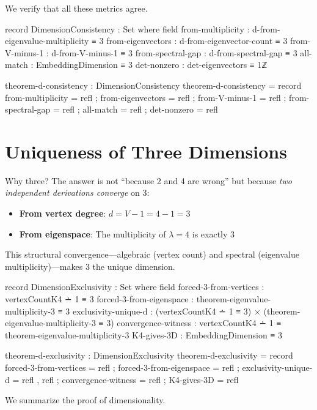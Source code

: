 \documentclass[11pt,a4paper]{book}
\begin{document}
We verify that all these metrics agree.

\begin{code}
record DimensionConsistency : Set where
  field
    from-multiplicity   : d-from-eigenvalue-multiplicity ≡ 3
    from-eigenvectors   : d-from-eigenvector-count ≡ 3
    from-V-minus-1      : d-from-V-minus-1 ≡ 3
    from-spectral-gap   : d-from-spectral-gap ≡ 3
    all-match           : EmbeddingDimension ≡ 3
    det-nonzero         : det-eigenvectors ≡ 1ℤ

theorem-d-consistency : DimensionConsistency
theorem-d-consistency = record
  { from-multiplicity   = refl
  ; from-eigenvectors   = refl
  ; from-V-minus-1      = refl
  ; from-spectral-gap   = refl
  ; all-match           = refl
  ; det-nonzero         = refl
  }
\end{code}

\section{Uniqueness of Three Dimensions}

Why three? The answer is not ``because 2 and 4 are wrong'' but because \emph{two independent derivations converge} on 3:
\begin{itemize}
\item \textbf{From vertex degree}: $d = V - 1 = 4 - 1 = 3$
\item \textbf{From eigenspace}: The multiplicity of $\lambda = 4$ is exactly 3
\end{itemize}
This structural convergence---algebraic (vertex count) and spectral (eigenvalue multiplicity)---makes 3 the unique dimension.

\begin{code}
record DimensionExclusivity : Set where
  field
    forced-3-from-vertices   : vertexCountK4 ∸ 1 ≡ 3
    forced-3-from-eigenspace : theorem-eigenvalue-multiplicity-3 ≡ 3
    exclusivity-unique-d     : (vertexCountK4 ∸ 1 ≡ 3) × (theorem-eigenvalue-multiplicity-3 ≡ 3)
    convergence-witness      : vertexCountK4 ∸ 1 ≡ theorem-eigenvalue-multiplicity-3
    K4-gives-3D              : EmbeddingDimension ≡ 3

theorem-d-exclusivity : DimensionExclusivity
theorem-d-exclusivity = record
  { forced-3-from-vertices = refl
  ; forced-3-from-eigenspace = refl
  ; exclusivity-unique-d = refl , refl
  ; convergence-witness = refl
  ; K4-gives-3D  = refl
  }
\end{code}

We summarize the proof of dimensionality.
\end{document}
